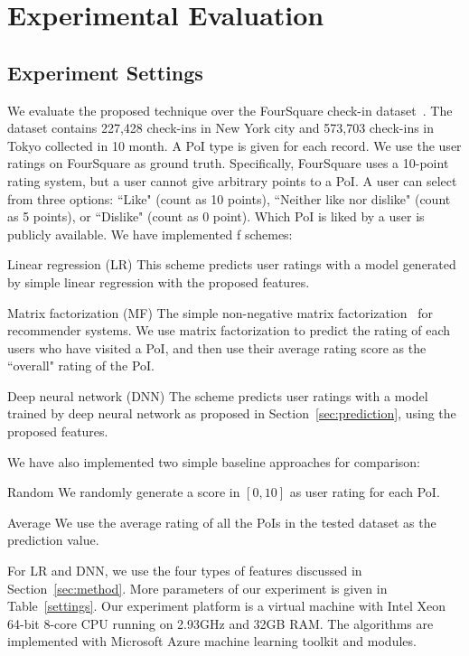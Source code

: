 \section{Experimental Evaluation}\label{sec:exp}

\subsection{Experiment Settings}

We evaluate the proposed technique over the FourSquare check-in dataset~\cite{yang2014modeling}. The dataset contains 227,428 check-ins in New York city and 573,703 check-ins in Tokyo collected in 10 month. A PoI type is given for each record. We use the user ratings on FourSquare as ground truth. Specifically, FourSquare uses a 10-point rating system, but a user cannot give arbitrary points to a PoI. A user can select from three options: ``Like" (count as 10 points), ``Neither like nor dislike" (count as 5 points), or ``Dislike" (count as 0 point). Which PoI is liked by a user is publicly available. We have implemented f schemes:
\begin{compactitem}
\item{Linear regression (LR)} This scheme predicts user ratings with a model generated by simple linear regression with the proposed features.
\item{Matrix factorization (MF)} The simple non-negative matrix factorization~\cite{koren2009matrix} for recommender systems. We use matrix factorization to predict the rating of each users who have visited a PoI, and then use their average rating score as the ``overall" rating of the PoI.
\item{Deep neural network (DNN)} The scheme predicts user ratings with a model trained by deep neural network as proposed in Section~\ref{sec:prediction}, using the proposed features.
\end{compactitem}
We have also implemented two simple baseline approaches for comparison: 
\begin{compactitem}
\item{Random} We randomly generate a score in $[0,10]$ as user rating for each PoI.
\item{Average} We use the average rating of all the PoIs in the tested dataset as the prediction value.
\end{compactitem}

For LR and DNN, we use the four types of features discussed in Section~\ref{sec:method}. More parameters of our experiment is given in Table~\ref{settings}. Our experiment platform is a virtual machine with Intel Xeon 64-bit 8-core CPU running on 2.93GHz and 32GB RAM. The algorithms are implemented with Microsoft Azure machine learning toolkit and modules. 

